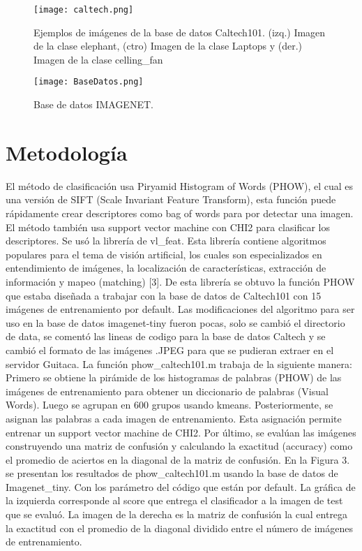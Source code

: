 \documentclass[10pt,twocolumn,letterpaper]{article}
\begin{document}
\begin{figure}[ht]
\centering
\texttt{[image: caltech.png]}
\caption{Ejemplos de imágenes de la base de datos Caltech101. (izq.) Imagen de la clase elephant, (ctro) Imagen de la clase Laptops y (der.) Imagen de la clase celling\_fan}
\end{figure}

\begin{figure}[ht]
\centering
\texttt{[image: BaseDatos.png]}
\caption{Base de datos IMAGENET.}
\end{figure}



\section{Metodología}

El método de clasificación usa Piryamid Histogram of Words (PHOW), el cual es una versión de SIFT (Scale Invariant Feature Transform), esta función puede rápidamente crear descriptores como bag of words para por detectar una imagen. El método también usa support vector machine con CHI2 para clasificar los descriptores. 
Se usó la librería de vl\_feat. Esta librería contiene algoritmos populares para el tema de visión artificial, los cuales son especializados en entendimiento de imágenes, la localización de características, extracción de información y mapeo (matching) [3]. De esta librería se obtuvo la función PHOW que estaba diseñada a trabajar con la base de datos de Caltech101 con  15 imágenes de entrenamiento por default. 
Las modificaciones del algoritmo para ser uso en la base de datos imagenet-tiny fueron pocas, solo se cambió el directorio de data, se comentó las lineas de codigo para la base de datos Caltech y se cambió el formato de las imágenes .JPEG para que se pudieran extraer en el servidor Guitaca. 
La función phow\_caltech101.m trabaja de la siguiente manera: Primero se obtiene la pirámide de los histogramas de palabras (PHOW) de las imágenes de entrenamiento para obtener un diccionario de palabras (Visual Words). Luego se agrupan en 600 grupos usando kmeans. Posteriormente, se asignan las palabras a cada imagen de entrenamiento. Esta asignación permite entrenar un support vector machine de CHI2. Por último, se evalúan las imágenes construyendo una matriz de confusión y calculando la exactitud (accuracy) como el promedio de aciertos en la diagonal de la matriz de confusión.  
En la Figura 3. se presentan los resultados de phow\_caltech101.m usando la base de datos de Imagenet\_tiny. Con los parámetro del código que están por default. La gráfica de la izquierda corresponde al score que entrega el clasificador a la imagen de test que se evaluó. La imagen de la derecha es la matriz de confusión la cual entrega la exactitud con el promedio de la diagonal dividido entre el número de imágenes de entrenamiento. 
\end{document}
